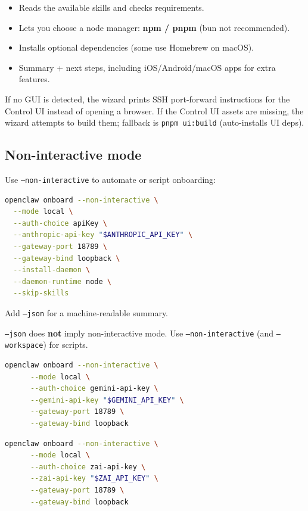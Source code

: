 \begin{itemize}
  \item Reads the available skills and checks requirements.
  \item Lets you choose a node manager: \textbf{npm / pnpm} (bun not recommended).
  \item Installs optional dependencies (some use Homebrew on macOS).
\end{itemize}

\begin{itemize}
  \item Summary + next steps, including iOS/Android/macOS apps for extra features.
\end{itemize}


If no GUI is detected, the wizard prints SSH port-forward instructions for the Control UI instead of opening a browser.
If the Control UI assets are missing, the wizard attempts to build them; fallback is \texttt{pnpm ui:build} (auto-installs UI deps).

\subsection{Non-interactive mode}


Use \texttt{--non-interactive} to automate or script onboarding:

\begin{lstlisting}[language=bash]
openclaw onboard --non-interactive \
  --mode local \
  --auth-choice apiKey \
  --anthropic-api-key "$ANTHROPIC_API_KEY" \
  --gateway-port 18789 \
  --gateway-bind loopback \
  --install-daemon \
  --daemon-runtime node \
  --skip-skills
\end{lstlisting}


Add \texttt{--json} for a machine‑readable summary.

\texttt{--json} does \textbf{not} imply non-interactive mode. Use \texttt{--non-interactive} (and \texttt{--workspace}) for scripts.

\begin{lstlisting}[language=bash]
    openclaw onboard --non-interactive \
      --mode local \
      --auth-choice gemini-api-key \
      --gemini-api-key "$GEMINI_API_KEY" \
      --gateway-port 18789 \
      --gateway-bind loopback
\end{lstlisting}

\begin{lstlisting}[language=bash]
    openclaw onboard --non-interactive \
      --mode local \
      --auth-choice zai-api-key \
      --zai-api-key "$ZAI_API_KEY" \
      --gateway-port 18789 \
      --gateway-bind loopback
\end{lstlisting}

